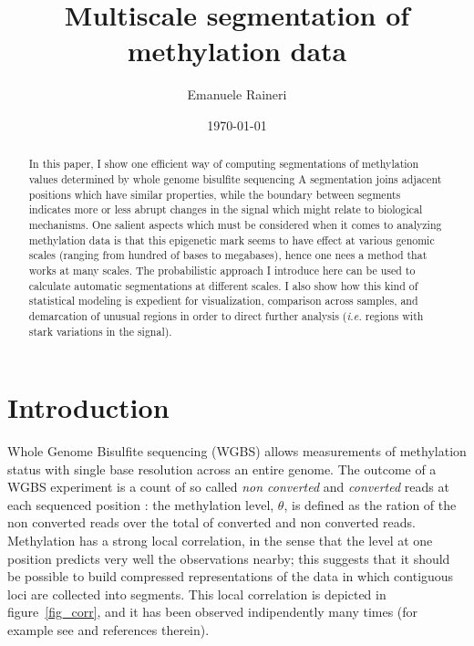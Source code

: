 \documentclass[12pt]{amsart}
\newcommand{\ie}{\textit{i.e.}}
\begin{document}
\title{Multiscale segmentation of methylation data}
\author{Emanuele Raineri}
\date{\today}
\maketitle

\begin{abstract}
In this paper, I show one efficient way of computing 
segmentations of methylation values determined by 
whole genome bisulfite sequencing
A segmentation joins adjacent positions
which have similar properties, while the boundary between segments 
indicates more or less abrupt changes
in the signal which might relate to biological mechanisms. 
One salient aspects which must be considered when it comes to 
analyzing methylation data is that this epigenetic mark seems 
to have effect at various genomic scales 
(ranging from hundred of bases to megabases), hence 
one nees a method that works at many scales. 
The probabilistic approach I introduce here 
can be used to calculate automatic segmentations at different scales.
I also show how this 
kind of statistical modeling is expedient for 
visualization, comparison across samples,
and demarcation of unusual regions in 
order to direct further analysis (\ie{} regions with stark variations in the signal).
\end{abstract}

\section{Introduction}

Whole Genome Bisulfite sequencing (WGBS) allows measurements of methylation 
status with single base resolution across an entire genome. The outcome
of a WGBS experiment is a count of so called {\it non converted} and {\it converted} 
reads at each 
sequenced position : the methylation level, $\theta$, is defined
as the ration of the non converted reads over the total of converted and non converted reads.
Methylation has a strong local correlation,
in the sense that the level at one position predicts 
very well the observations nearby; this suggests that it should be possible
to build compressed representations of the data in which contiguous loci 
are collected into segments.
This local correlation is depicted in figure~\ref{fig_corr},
and it has been observed indipendently many times (for example
see \cite{bsmooth} and references therein).
\end{document}
